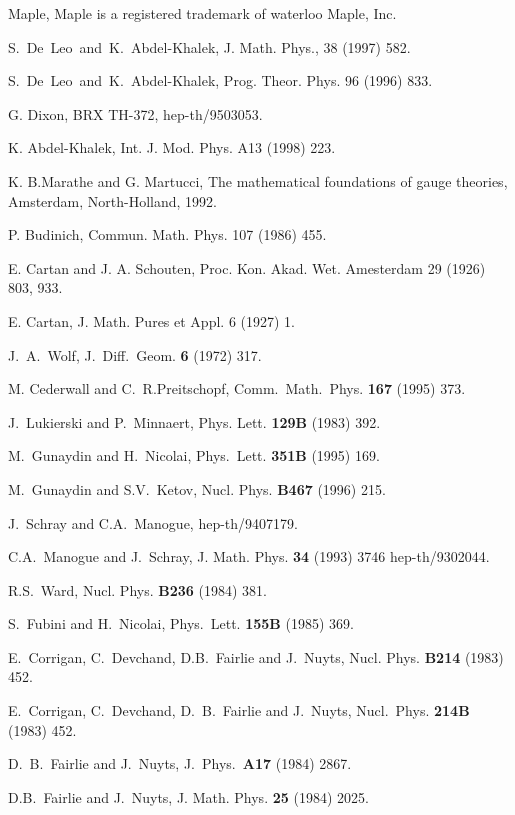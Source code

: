 \documentclass[a4paper,12pt]{book}
\begin{document}
\begin{thebibliography}{999}
  Maple, Maple is a registered trademark of waterloo Maple,
Inc.

  S.~De~Leo~and~K.~Abdel-Khalek, J. Math. Phys., 38 (1997) 582.

  S.~De~Leo~and~K.~Abdel-Khalek, Prog. Theor. Phys. 96 (1996)
833.

  G. Dixon, BRX TH-372, hep-th/9503053.

  K. Abdel-Khalek, Int. J. Mod. Phys. A13 (1998) 223.

  K. B.Marathe and G. Martucci, The mathematical
foundations of gauge theories, Amsterdam, North-Holland, 1992.

  P. Budinich, Commun. Math. Phys. 107 (1986) 455.

  E. Cartan and J. A. Schouten, Proc. Kon. Akad. Wet.
Amesterdam 29 (1926) 803, 933.

  E. Cartan, J. Math. Pures et Appl. 6 (1927) 1.

  J.~A.~Wolf, J.~Diff.~Geom. \textbf{6} (1972) 317.

  M. Cederwall and C.~R.Preitschopf, Comm.~Math.~Phys. \textbf{%
167} (1995) 373.

  J.~Lukierski and P.~Minnaert, Phys. Lett. \textbf{129B}
(1983) 392.

  M.~Gunaydin and H.~Nicolai, Phys.~Lett. \textbf{351B}
(1995) 169.

  M.~Gunaydin and S.V.~Ketov, Nucl. Phys. \textbf{B467}
(1996) 215.

  J.~Schray and C.A.~Manogue, hep-th/9407179.

  C.A.~Manogue and J.~Schray, J. Math. Phys. \textbf{34}
(1993) 3746 hep-th/9302044.

  R.S.~Ward, Nucl. Phys. \textbf{B236} (1984) 381.

  S.~Fubini and H.~Nicolai, Phys.~Lett. \textbf{155B} (1985)
369.

  E.~Corrigan, C.~Devchand, D.B.~Fairlie and J.~Nuyts, Nucl.
Phys. \textbf{B214} (1983) 452.

  E.~Corrigan, C.~Devchand, D.~B.~Fairlie and J.~Nuyts,
Nucl.~Phys. \textbf{214B} (1983) 452.

  D.~B.~Fairlie and J.~Nuyts, J.~Phys.~\textbf{A17} (1984) 2867.

  D.B.~Fairlie and J.~Nuyts, J. Math. Phys. \textbf{25} (1984)
2025.


\end{thebibliography}
\end{document}
